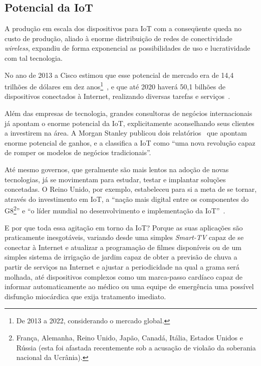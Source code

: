 \documentclass[pdftex, brazil, 12pt, twoside]{article}
\newcommand{\ingles}[1]{\textit{#1}}
\begin{document}
\subsection{Potencial da IoT}
\label{intro-potencial}

A produção em escala dos dispositivos para IoT com a conseqüente queda no custo
de produção, aliado à enorme distribuição de redes de conectividade \ingles{wireless},
expandiu de forma exponencial as possibilidades de uso e lucratividade com
tal tecnologia.

No ano de 2013 a Cisco estimou que esse potencial
de mercado era de 14,4 trilhões de dólares em dez anos\footnote{De 2013 a 2022, considerando
o mercado global.}~\citep{CiscoIoTFAQ2013},
e que até 2020 haverá 50,1 bilhões de dispositivos conectados à Internet,
realizando diversas tarefas e serviços~\citep{CiscoIoEConnectionsCounter}.

Além das empresas de tecnologia, grandes consultoras de negócios internacionais
já apontam o enorme potencial da IoT, explicitamente aconselhando
seus clientes a investirem na área.
A Morgan Stanley publicou dois relatórios~\citep{MorganStanleyIoTnow2013,MorganStanleyIoTpersonal2014}
que apontam enorme potencial de ganhos, e a \citet{OliverWymanIoT2015} classifica
a IoT como ``uma nova revolução capaz de romper os modelos de negócios tradicionais''.

Até mesmo governos, que geralmente são mais lentos na adoção de novas tecnologias, já
se movimentam para estudar, testar e implantar soluções concetadas. O Reino Unido,
por exemplo, estabeleceu para si a meta de se tornar, através do investimento em IoT,
a ``nação mais digital entre os componentes do G8\footnote{França, Alemanha, Reino Unido,
  Japão, Canadá, Itália, Estados Unidos e Rússia (esta foi afastada recentemente sob
  a acusação de violaão da soberania nacional da Ucrânia).}'' e 
``o líder mundial no desenvolvimento e implementação da IoT''~\citep{UKGOSWalportIoT2014}.

E por que toda essa agitação em torno da IoT? Porque as suas aplicações
são praticamente inesgotáveis, variando desde uma simples
\ingles{Smart-TV} capaz de se conectar à Internet e atualizar a programação de
filmes disponíveis ou de um simples sistema de irrigação de jardim capaz de
obter a previsão de chuva a partir de serviços na Internet e ajustar a periodicidade
na qual a grama será molhada, até dispositivos complexos como um marca-passo cardíaco
capaz de informar automaticamente ao médico ou uma equipe de emergência uma possível
disfunção miocárdica que exija tratamento imediato.
\end{document}

